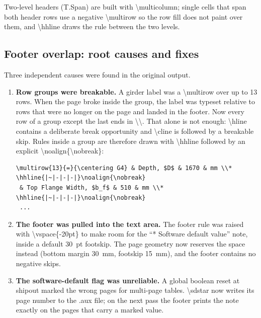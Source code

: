 \documentclass[10pt,a4paper]{article}
\newcommand{\code}[1]{{\small\ttfamily #1}}
\newenvironment{codeblock}{\par\small\begingroup}{\endgroup\par}
\begin{document}
Two-level headers (\code{T.Span}) are built with \code{\textbackslash multicolumn}; single cells that span both header rows use a negative \code{\textbackslash multirow} so the row fill does not paint over them, and \code{\textbackslash hhline} draws the rule between the two levels.

\subsection{Footer overlap: root causes and fixes}

Three independent causes were found in the original output.

\begin{enumerate}
\item \textbf{Row groups were breakable.} A girder label was a \code{\textbackslash multirow} over up to 13 rows. When the page broke inside the group, the label was typeset relative to rows that were no longer on the page and landed in the footer. Now every row of a group except the last ends in \code{\textbackslash\textbackslash*}. That alone is not enough: \code{\textbackslash hline} contains a deliberate break opportunity and \code{\textbackslash cline} is followed by a breakable skip. Rules inside a group are therefore drawn with \code{\textbackslash hhline} followed by an explicit \code{\textbackslash noalign\{\textbackslash nobreak\}}:
\begin{codeblock}
\begin{verbatim}
\multirow{13}{=}{\centering G4} & Depth, $D$ & 1670 & mm \\*
\hhline{|~|-|-|-|}\noalign{\nobreak}
 & Top Flange Width, $b_f$ & 510 & mm \\*
\hhline{|~|-|-|-|}\noalign{\nobreak}
 ...
\end{verbatim}
\end{codeblock}
\item \textbf{The footer was pulled into the text area.} The footer rule was raised with \code{\textbackslash vspace\{-20pt\}} to make room for the ``* Software default value'' note, inside a default 30~pt footskip. The page geometry now reserves the space instead (bottom margin 30~mm, footskip 15~mm), and the footer contains no negative skips.
\item \textbf{The software-default flag was unreliable.} A global boolean reset at shipout marked the wrong pages for multi-page tables. \code{\textbackslash sdstar} now writes its page number to the \code{.aux} file; on the next pass the footer prints the note exactly on the pages that carry a marked value.
\end{enumerate}
\end{document}
